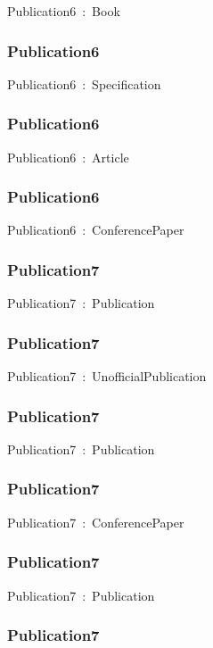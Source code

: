 \documentclass{article}
\begin{document}
Publication6~:~Book

\subsubsection*{Publication6}

Publication6~:~Specification

\subsubsection*{Publication6}

Publication6~:~Article

\subsubsection*{Publication6}

Publication6~:~ConferencePaper

\subsubsection*{Publication7}

Publication7~:~Publication

\subsubsection*{Publication7}

Publication7~:~UnofficialPublication

\subsubsection*{Publication7}

Publication7~:~Publication

\subsubsection*{Publication7}

Publication7~:~ConferencePaper

\subsubsection*{Publication7}

Publication7~:~Publication

\subsubsection*{Publication7}
\end{document}

